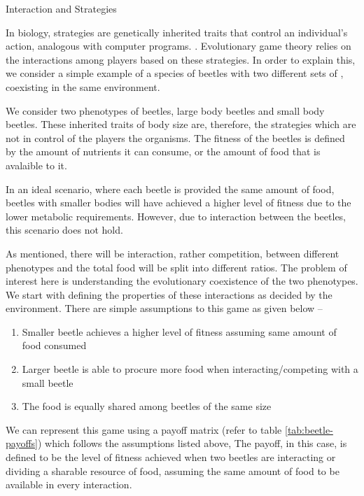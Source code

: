 \documentclass{article}
\begin{document}
\begin{ssection}{Interaction and Strategies}

	In biology, strategies are genetically inherited traits that control an individual's action, analogous with computer programs. \citep{wiki}. Evolutionary game theory relies on the interactions among players based on these strategies. In order to explain this, we consider a simple example of a species of beetles with two different sets of , coexisting in the same environment.

	 We consider two phenotypes of beetles, large body beetles and small body beetles. These inherited traits of body size are, therefore, the strategies which are not in control of the players \ie the organisms. The fitness of the beetles is defined by the amount of nutrients it can consume, or the amount of food that is avalaible to it.

	In an ideal scenario, where each beetle is provided the same amount of food, beetles with smaller bodies will have achieved a higher level of fitness due to the lower metabolic requirements. However, due to interaction between the beetles, this scenario does not hold.

	As mentioned, there will be interaction, rather competition, between different phenotypes and the total food will be split into different ratios. The problem of interest here is understanding the evolutionary coexistence of the two phenotypes. We start with defining the properties of these interactions as decided by the environment. There are simple assumptions to this game as given below --
	\begin{enumerate}
		\item Smaller beetle achieves a higher level of fitness assuming same amount of food consumed
		\item Larger beetle is able to procure more food when interacting/competing with a small beetle
		\item The food is equally shared among beetles of the same size
	\end{enumerate}

	We can represent this game using a payoff matrix (refer to table \ref{tab:beetle-payoffs}) which follows the assumptions listed above, The payoff, in this case, is defined to be the level of fitness achieved when two beetles are interacting or dividing a sharable resource of food, assuming the same amount of food to be available in every interaction.


\end{ssection}
\end{document}
